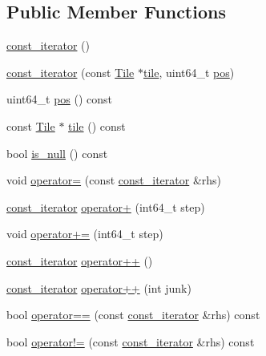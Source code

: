 \subsection*{Public Member Functions}
\begin{DoxyCompactItemize}
\item 
\hyperlink{classTile_1_1const__iterator_a947159e49e74c21b3bca198ac64303b0}{const\+\_\+iterator} ()
\item 
\hyperlink{classTile_1_1const__iterator_a5fa69ce53e212f1cd2a5fa650246eaa5}{const\+\_\+iterator} (const \hyperlink{classTile}{Tile} $\ast$\hyperlink{classTile_1_1const__iterator_a431e300f015ea57c6d02cac7ab49eb71}{tile}, uint64\+\_\+t \hyperlink{classTile_1_1const__iterator_aa369b7db490030753e61dbec3e372a0b}{pos})
\item 
uint64\+\_\+t \hyperlink{classTile_1_1const__iterator_aa369b7db490030753e61dbec3e372a0b}{pos} () const 
\item 
const \hyperlink{classTile}{Tile} $\ast$ \hyperlink{classTile_1_1const__iterator_a431e300f015ea57c6d02cac7ab49eb71}{tile} () const 
\item 
bool \hyperlink{classTile_1_1const__iterator_a0ac306797848537ee994ca3a47cf998e}{is\+\_\+null} () const 
\item 
void \hyperlink{classTile_1_1const__iterator_a16519b02de6eb73318de44672f794d67}{operator=} (const \hyperlink{classTile_1_1const__iterator}{const\+\_\+iterator} \&rhs)
\item 
\hyperlink{classTile_1_1const__iterator}{const\+\_\+iterator} \hyperlink{classTile_1_1const__iterator_a112deafa6114a1ee62d5fb508f0beff0}{operator+} (int64\+\_\+t step)
\item 
void \hyperlink{classTile_1_1const__iterator_a8570ada56b617d4346c6778fb3132363}{operator+=} (int64\+\_\+t step)
\item 
\hyperlink{classTile_1_1const__iterator}{const\+\_\+iterator} \hyperlink{classTile_1_1const__iterator_a1ef11aafc48309f43d4cd145c2632d35}{operator++} ()
\item 
\hyperlink{classTile_1_1const__iterator}{const\+\_\+iterator} \hyperlink{classTile_1_1const__iterator_a7ee822fbc20874c8aa12b7fa8dd2c86d}{operator++} (int junk)
\item 
bool \hyperlink{classTile_1_1const__iterator_abd434ce4a12e6f02aadf78bdf2610ecf}{operator==} (const \hyperlink{classTile_1_1const__iterator}{const\+\_\+iterator} \&rhs) const 
\item 
bool \hyperlink{classTile_1_1const__iterator_af9ad0510d24694bc14f17b3cb1278ba6}{operator!=} (const \hyperlink{classTile_1_1const__iterator}{const\+\_\+iterator} \&rhs) const 

\end{DoxyCompactItemize}
